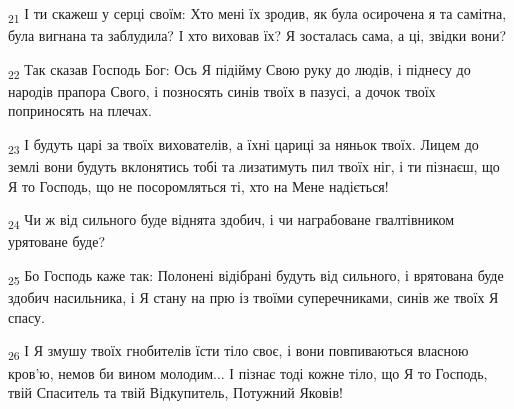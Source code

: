\begin{tcolorbox}
\textsubscript{21} І ти скажеш у серці своїм: Хто мені їх зродив, як була осирочена я та самітна, була вигнана та заблудила? І хто виховав їх? Я зосталась сама, а ці, звідки вони?
\end{tcolorbox}
\begin{tcolorbox}
\textsubscript{22} Так сказав Господь Бог: Ось Я підійму Свою руку до людів, і піднесу до народів прапора Свого, і позносять синів твоїх в пазусі, а дочок твоїх поприносять на плечах.
\end{tcolorbox}
\begin{tcolorbox}
\textsubscript{23} І будуть царі за твоїх вихователів, а їхні цариці за няньок твоїх. Лицем до землі вони будуть вклонятись тобі та лизатимуть пил твоїх ніг, і ти пізнаєш, що Я то Господь, що не посоромляться ті, хто на Мене надіється!
\end{tcolorbox}
\begin{tcolorbox}
\textsubscript{24} Чи ж від сильного буде віднята здобич, і чи награбоване гвалтівником урятоване буде?
\end{tcolorbox}
\begin{tcolorbox}
\textsubscript{25} Бо Господь каже так: Полонені відібрані будуть від сильного, і врятована буде здобич насильника, і Я стану на прю із твоїми суперечниками, синів же твоїх Я спасу.
\end{tcolorbox}
\begin{tcolorbox}
\textsubscript{26} І Я змушу твоїх гнобителів їсти тіло своє, і вони повпиваються власною кров'ю, немов би вином молодим... І пізнає тоді кожне тіло, що Я то Господь, твій Спаситель та твій Відкупитель, Потужний Яковів!
\end{tcolorbox}
